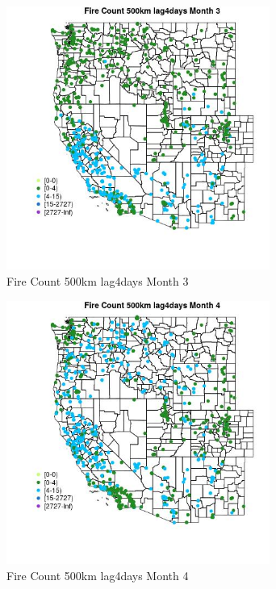 \begin{figure} 
\centering  
\includegraphics[width=0.77\textwidth]{Code_Outputs/Report_ML_input_PM25_Step4_part_f_de_duplicated_aveswNAs_MapObsMo3Fire_Count_500km_lag4days.jpg} 
\caption{\label{fig:Report_ML_input_PM25_Step4_part_f_de_duplicated_aveswNAsMapObsMo3Fire_Count_500km_lag4days}Fire Count 500km lag4days Month 3} 
\end{figure} 
 

\begin{figure} 
\centering  
\includegraphics[width=0.77\textwidth]{Code_Outputs/Report_ML_input_PM25_Step4_part_f_de_duplicated_aveswNAs_MapObsMo4Fire_Count_500km_lag4days.jpg} 
\caption{\label{fig:Report_ML_input_PM25_Step4_part_f_de_duplicated_aveswNAsMapObsMo4Fire_Count_500km_lag4days}Fire Count 500km lag4days Month 4} 
\end{figure} 
 

